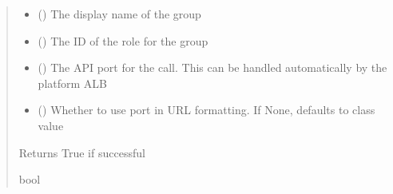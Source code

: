 \documentclass[letterpaper,10pt,english]{sphinxmanual}
\begin{document}
\begin{fulllineitems}
\begin{fulllineitems}
\begin{quote}
\begin{description}
\begin{itemize}
\item {} 
\sphinxAtStartPar
{} () \textendash{} The display name of the group

\item {} 
\sphinxAtStartPar
{} () \textendash{} The ID of the role for the group

\item {} 
\sphinxAtStartPar
{} (\sphinxstyleliteralemphasis{\sphinxupquote{ (}}\sphinxstyleliteralemphasis{\sphinxupquote{)}}) \textendash{} The API port for the call. This can be handled automatically by the platform ALB

\item {} 
\sphinxAtStartPar
{} (\sphinxstyleliteralemphasis{\sphinxupquote{ (}}\sphinxstyleliteralemphasis{\sphinxupquote{)}}) \textendash{} Whether to use port in URL formatting. If None, defaults to class value

\end{itemize}

\sphinxAtStartPar
{} \textendash{} Returns True if successful

\sphinxAtStartPar
bool

\end{description}\end{quote}

\end{fulllineitems}



\end{fulllineitems}
\end{document}
